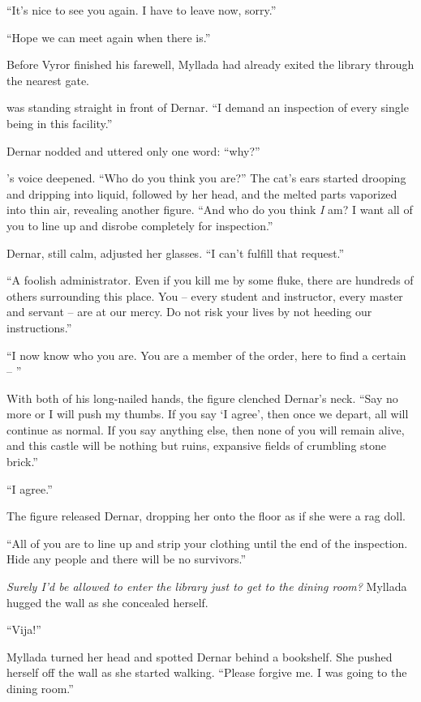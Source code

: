 ``It's nice to see you again. I have to leave now, sorry.''

``Hope we can meet again when there is.''

Before Vyror finished his farewell, Myllada had already exited the library through the nearest gate.

\centeredstars

\yronsyncra{} was standing straight in front of Dernar. ``I demand an inspection of every single being in this facility.''

Dernar nodded and uttered only one word: ``why?''

\yronsyncra's voice deepened. ``Who do you think you are?'' The cat's ears started drooping and dripping into liquid, followed by her head, and the melted parts vaporized into thin air, revealing another figure. ``And who do you think \emph{I} am? I want all of you to line up and disrobe completely for inspection.''

Dernar, still calm, adjusted her glasses. ``I can't fulfill that request.''

``A foolish administrator. Even if you kill me by some fluke, there are hundreds of others surrounding this place. You -- every student and instructor, every master and servant -- are at our mercy. Do not risk your lives by not heeding our instructions.''

``I now know who you are. You are a member of the order, here to find a certain -- ''

With both of his long-nailed hands, the figure clenched Dernar's neck. ``Say no more or I will push my thumbs. If you say `I agree', then once we depart, all will continue as normal. If you say anything else, then none of you will remain alive, and this castle will be nothing but ruins, expansive fields of crumbling stone brick.''

``I agree.''

The figure released Dernar, dropping her onto the floor as if she were a rag doll.

``All of you are to line up and strip your clothing until the end of the inspection. Hide any people and there will be no survivors.''

\centeredstars

\emph{Surely I'd be allowed to enter the library just to get to the dining room?} Myllada hugged the wall as she concealed herself.

``Vija!''

Myllada turned her head and spotted Dernar behind a bookshelf. She pushed herself off the wall as she started walking. ``Please forgive me. I was going to the dining room.''

